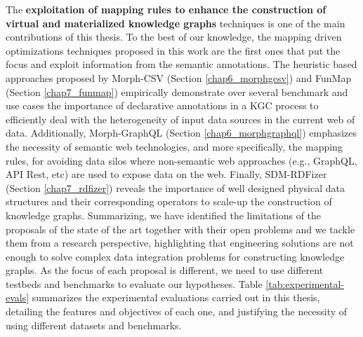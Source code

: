 The \textbf{exploitation of mapping rules to enhance the construction of virtual and materialized knowledge graphs} techniques is one of the main contributions of this thesis. To the best of our knowledge, the mapping driven optimizations techniques proposed in this work are the first ones that put the focus and exploit information from the semantic annotations. The heuristic based approaches proposed by Morph-CSV (Section \ref{chap6_morphgcsv}) and FunMap (Section \ref{chap7_funmap}) empirically demonstrate over several benchmark and use cases the importance of declarative annotations in a KGC process to efficiently deal with the heterogeneity of input data sources in the current web of data. Additionally, Morph-GraphQL (Section \ref{chap6_morphgraphql}) emphasizes the necessity of semantic web technologies, and more specifically, the mapping rules, for avoiding data silos where non-semantic web approaches (e.g., GraphQL, API Rest, etc) are used to expose data on the web. Finally, SDM-RDFizer (Section \ref{chap7_rdfizer}) reveals the importance of well designed physical data structures and their corresponding operators to scale-up the construction of knowledge graphs. Summarizing, we have identified the limitations of the proposals of the state of the art together with their open problems and we tackle them from a research perspective, highlighting that engineering solutions are not enough to solve complex data integration problems for constructing knowledge graphs. As the focus of each proposal is different, we need to use different testbeds and benchmarks to evaluate our hypotheses. Table \ref{tab:experimental-evals} summarizes the experimental evaluations carried out in this thesis, detailing the features and objectives of each one, and justifying the necessity of using different datasets and benchmarks.

